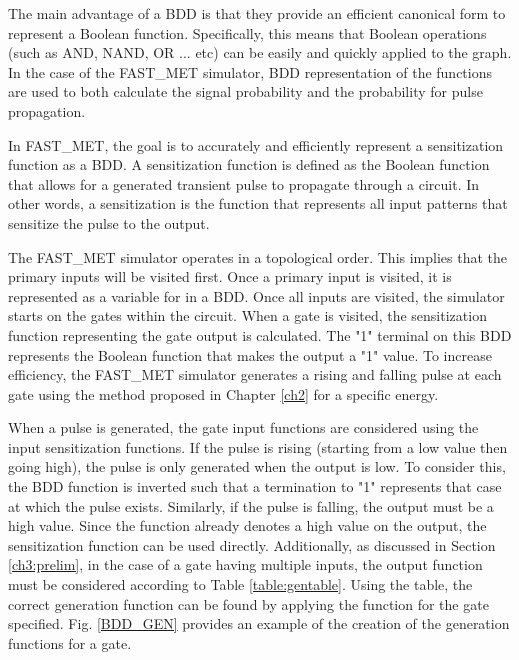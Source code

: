The main advantage of a BDD is that they provide an efficient canonical form to represent a Boolean function. Specifically, this means that Boolean operations (such as AND, NAND, OR ... etc) can be easily and quickly applied to the graph. In the case of the FAST\_MET simulator, BDD representation of the functions are used to both calculate the signal probability and the probability for pulse propagation.

In FAST\_MET, the goal is to accurately and efficiently represent a sensitization function as a BDD. A sensitization function is defined as the Boolean function that allows for a generated transient pulse to propagate through a circuit. In other words, a sensitization is the function that represents all input patterns that sensitize the pulse to the output. 

The FAST\_MET simulator operates in a topological order. This implies that the primary inputs will be visited first. Once a primary input is visited, it is represented as a variable for in a BDD. Once all inputs are visited, the simulator starts on the gates within the circuit. When a gate is visited, the sensitization function representing the gate output is calculated. The "1" terminal on this BDD represents the Boolean function that makes the output a "1" value. To increase efficiency, the FAST\_MET simulator generates a rising and falling pulse at each gate using the method proposed in Chapter \ref{ch2} for a specific energy.

When a pulse is generated, the gate input functions are considered using the input sensitization functions. If the pulse is rising (starting from a low value then going high), the pulse is only generated when the output is low. To consider this, the BDD function is inverted such that a termination to "1" represents that case at which the pulse exists. Similarly, if the pulse is falling, the output must be a high value. Since the function already denotes a high value on the output, the sensitization function can be used directly. Additionally, as discussed in Section \ref{ch3:prelim}, in the case of a gate having multiple inputs, the output function must be considered according to Table \ref{table:gentable}. Using the table, the correct generation function can be found by applying the function for the gate specified. Fig. \ref{BDD_GEN} provides an example of the creation of the generation functions for a gate.

